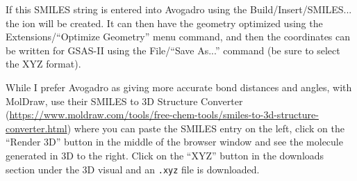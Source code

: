 If this SMILES string is entered into Avogadro using the Build/Insert/SMILES... the ion will be created. It can then have the geometry optimized using the Extensions/``Optimize Geometry'' menu command, and then the coordinates can be written for GSAS-II using the File/``Save As...'' command (be sure to select the XYZ format). 

While I prefer Avogadro as giving more accurate bond distances and angles, with MolDraw, use their SMILES to 3D Structure Converter (\url{https://www.moldraw.com/tools/free-chem-tools/smiles-to-3d-structure-converter.html}) where you can paste the SMILES entry on the left, click on the ``Render 3D'' button in the middle of the browser window and see the molecule generated in 3D to the right. Click on the ``XYZ'' button in the downloads section under the 3D visual and an \texttt{.xyz} file is downloaded. 

